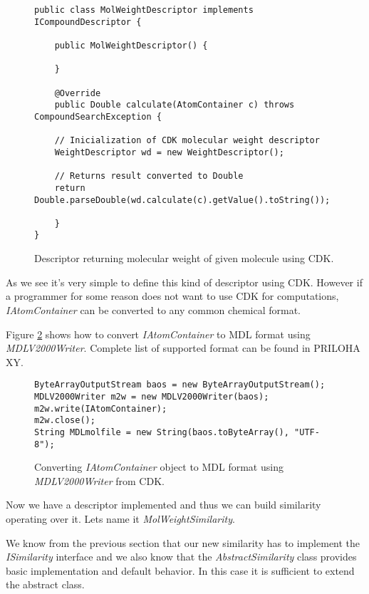 \documentclass[thesis=M,english]{FITthesis}[2012/10/20]
\begin{document}
\begin{figure}
\begin{lstlisting}
public class MolWeightDescriptor implements ICompoundDescriptor {
    
    public MolWeightDescriptor() {
	
    }

    @Override
    public Double calculate(AtomContainer c) throws CompoundSearchException {
	
	// Inicialization of CDK molecular weight descriptor
	WeightDescriptor wd = new WeightDescriptor();	
	
	// Returns result converted to Double
	return Double.parseDouble(wd.calculate(c).getValue().toString());
	
    } 
}
\end{lstlisting}
\caption{Descriptor returning molecular weight of given molecule using CDK.}
\label{MolWeightDescriptorCode}
\end{figure}

As we see it’s very simple to define this kind of descriptor using CDK. However if a programmer for some reason does not want to use CDK for computations, \textit{IAtomContainer} can be converted to any common chemical format. 

Figure \ref{ConvertAtomToMDL} shows how to convert \textit{IAtomContainer} to MDL format using \textit{MDLV2000Writer}. Complete list of supported format can be found in PRILOHA XY.

\begin{figure}
\begin{lstlisting}
ByteArrayOutputStream baos = new ByteArrayOutputStream();
MDLV2000Writer m2w = new MDLV2000Writer(baos);
m2w.write(IAtomContainer);
m2w.close();
String MDLmolfile = new String(baos.toByteArray(), "UTF-8");
\end{lstlisting}
\caption{Converting \textit{IAtomContainer} object to MDL format using \textit{MDLV2000Writer} from CDK.}
\label{ConvertAtomToMDL}
\end{figure}

Now we have a descriptor implemented and thus we can build similarity operating over it. Lets name it \textit{MolWeightSimilarity}.

We know from the previous section that our new similarity has to implement the \textit{ISimilarity} interface and we also know that the \textit{AbstractSimilarity} class provides basic implementation and default behavior. In this case it is sufficient to extend the abstract class. 
\end{document}
